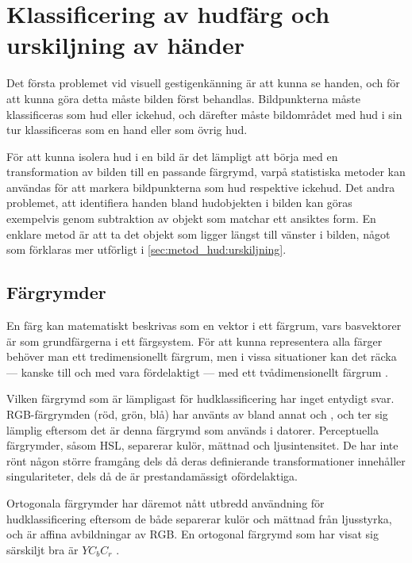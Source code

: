 \documentclass[../rapport_MVEX01-11-05]{subfiles}
\begin{document}
\section{Klassificering av hudfärg och urskiljning av händer}\label{sec:hudklassificering}
Det första problemet vid visuell gestigenkänning är att kunna se handen,
och för att kunna göra detta
måste bilden först behandlas. Bildpunkterna måste klassificeras som hud 
eller ickehud, och därefter måste bildområdet med hud i sin tur 
klassificeras som en hand eller som övrig hud.

För att kunna isolera hud i en bild är det lämpligt att börja med
en transformation av bilden till en
passande färgrymd, varpå statistiska metoder kan användas för att
markera bildpunkterna som hud respektive ickehud.
Det andra problemet, att identifiera handen bland hudobjekten i bilden kan göras
exempelvis genom subtraktion av objekt som matchar ett ansiktes form. En enklare
metod är att ta det objekt som ligger längst till vänster i bilden, 
något som förklaras mer utförligt i \ref{sec:metod_hud:urskiljning}.

\subsection{Färgrymder}\label{sec:klassificering:fargrymder}
En färg kan matematiskt beskrivas som en vektor i ett färgrum, vars
basvektorer är som grundfärgerna i ett färgsystem.
För att kunna representera alla färger
behöver man ett tredimensionellt färgrum, men i vissa situationer kan
det räcka --- kanske till och med vara fördelaktigt --- med ett
tvådimensionellt färgrum \cite{Kakumanu07}.

Vilken färgrymd som är lämpligast för hudklassificering har inget
entydigt svar.
RGB-färgrymden (röd, grön, blå) har använts av bland annat
 och , och ter sig lämplig
eftersom det är denna färgrymd som används i datorer. Perceptuella
färgrymder, såsom HSL, separerar kulör, mättnad och ljusintensitet.
De har inte rönt någon större framgång dels då deras definierande
transformationer innehåller singulariteter, dels då de är
prestandamässigt ofördelaktiga.

Ortogonala färgrymder har däremot nått utbredd användning för
hudklassificering \cite{Hsu02,Elmezain08,Hassanpour08} eftersom de
både separerar kulör och mättnad från ljusstyrka, och är affina avbildningar av
RGB. 
En ortogonal färgrymd som har visat sig särskiljt bra är $YC_bC_r$ \cite{Kakumanu07}.
\end{document}
